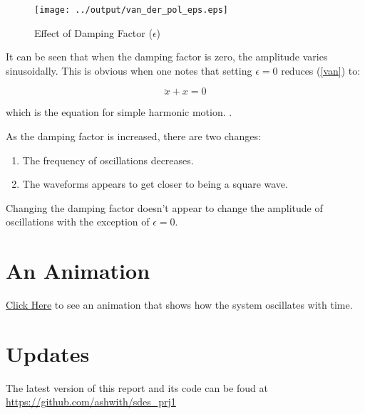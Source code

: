 \documentclass[12pt]{article}
\begin{document}
\begin{figure}[H]
  \centering
  \texttt{[image: ../output/van\_der\_pol\_eps.eps]}
  \caption{Effect of Damping Factor ($\epsilon$)}
  \label{fig:eps}
\end{figure}


It can be seen that when the damping factor is zero, the amplitude
varies sinusoidally. This is obvious when one notes that setting
$\epsilon = 0$ reduces (\ref{van}) to:

\begin{equation}
\ddot{x} + x = 0
\end{equation}

which is the equation for simple harmonic motion. \cite{shm}.

As the damping factor is increased, there are two changes:

\begin{enumerate}
\item The frequency of oscillations decreases.
\item The waveforms appears to get closer to being a square wave.
\end{enumerate}

Changing the damping factor doesn't appear to change the amplitude of
oscillations with the exception of $\epsilon = 0$.

\section{An Animation}

\href{143079021.html}{Click Here} to see an animation that
shows how the system oscillates with time.

\section{Updates}
The latest version of this report and its code can be foud at
\url{https://github.com/ashwith/sdes_prj1}



\end{document}
